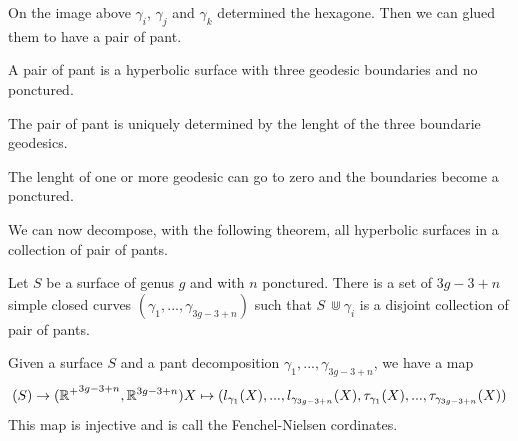  On the image above $\gamma_i$, $\gamma_j$ and $\gamma_k$ determined the hexagone. Then we can glued them to have a pair of pant.

 \begin{dfnt}
 A pair of pant is a hyperbolic surface with three geodesic boundaries and no ponctured.
 \end{dfnt}

\begin{rmq}
The pair of pant is uniquely determined by the lenght of the three boundarie geodesics.
\end{rmq}

\begin{rmq}
The lenght of one or more geodesic can go to zero and the boundaries become a ponctured.
\end{rmq}

We can now decompose, with the following theorem, all hyperbolic surfaces in a collection of pair of pants.

\begin{thm}
Let $S$ be a surface of genus $g$ and with $n$ ponctured. There is a set of $3g-3+n$ simple closed curves $(\gamma_1,...,\gamma_{3g-3+n})$ such that $S\ \Cup \gamma_i$ is a disjoint collection of pair of pants.
\end{thm}

\begin{dfnt}
Given a surface $S$ and a pant decomposition $\gamma_1,...,\gamma_{3g-3+n}$, we have a map \[
\mathcal(S) \rightarrow (\mathbb{R^{+}}^{3g-3+n},\mathbb{R}^{3g-3+n}) \\
X \mapsto (l_{\gamma_1}(X),...,l_{\gamma_{3g-3+n}}(X),\tau_{\gamma_1}(X),...,\tau_{\gamma_{3g-3+n}}(X))
\]
This map is injective and is call the Fenchel-Nielsen cordinates.
\end{dfnt}

